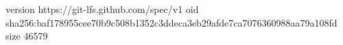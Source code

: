 version https://git-lfs.github.com/spec/v1
oid sha256:baf178955cee70b9c508b1352c3ddeca3eb29afde7ca7076360988aa79a108fd
size 46579
